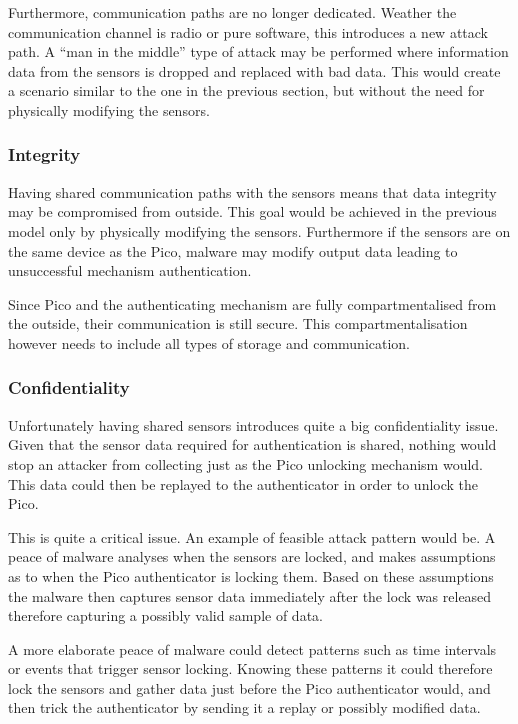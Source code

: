 	Furthermore, communication paths are no longer dedicated. Weather the communication channel is radio or pure software, this introduces a new attack path. A ``man in the middle'' type of attack may be performed where information data from the sensors is dropped and replaced with bad data. This would create a scenario similar to the one in the previous section, but without the need for physically modifying the sensors.
	
	\subsubsection*{Integrity}
	Having shared communication paths with the sensors means that data integrity may be compromised from outside. This goal would be achieved in the previous model only by physically modifying the sensors. Furthermore if the sensors are on the same device as the Pico, malware may modify output data leading to unsuccessful mechanism authentication.
	
	Since Pico and the authenticating mechanism are fully compartmentalised from the outside, their communication is still secure. This compartmentalisation however needs to include all types of storage and communication.

	\subsubsection*{Confidentiality}
	Unfortunately having shared sensors introduces quite a big confidentiality issue. Given that the sensor data required for authentication is shared, nothing would stop an attacker from collecting just as the Pico unlocking mechanism would. This data could then be replayed to the authenticator in order to unlock the Pico. 
	
	This is quite a critical issue. An example of feasible attack pattern would be. A peace of malware analyses when the sensors are locked, and makes assumptions as to when the Pico authenticator is locking them. Based on these assumptions the malware then captures sensor data immediately after the lock was released therefore capturing a possibly valid sample of data. 
	
	A more elaborate peace of malware could detect patterns such as time intervals or events that trigger sensor locking. Knowing these patterns it could therefore lock the sensors and gather data just before the Pico authenticator would, and then trick the authenticator by sending it a replay or possibly modified data.
	
